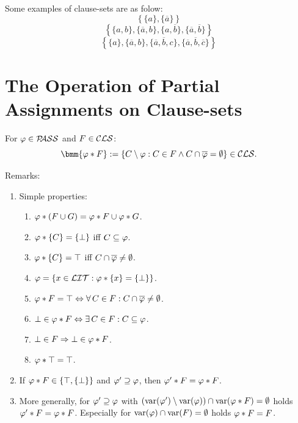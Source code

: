 \documentclass[12pt]{book}
\begin{document}
\begin{examp}\label{exp:cls}
Some examples of clause-sets are as folow:
\begin{displaymath}
     \left\{\{a\}, \{\overline{a}\}\right\}
  \end{displaymath} 
  \begin{displaymath}
     \left\{\{a,b\}, \{\overline{a},b\}, \{a, \overline{b}\}, \{\overline{a},\overline{b}\}\right\}
  \end{displaymath}
  \begin{displaymath}
     \left\{\{a\}, \{\overline{a},b\}, \{\overline{a}, \overline{b}, c\}, \{\overline{a}, \overline{b}, \overline{c}\}\right\}
  \end{displaymath}
\end{examp}


\section{The Operation of Partial Assignments on Clause-sets}
\label{sec:oppasscls}

\begin{defi}\label{def:oppassCls}
  For $\varphi \in \mathcal{P\hspace{-0.32em}ASS}$ and $F \in \mathcal{CLS}$:
  \begin{displaymath}
    \bmm{\vp * F} := \set{C \sm \vp : C \in F \wedge C \cap \ol{\vp} = \es} \in \Cls.
  \end{displaymath}
\end{defi}
Remarks:
\begin{enumerate}
\item Simple properties:
  \begin{enumerate}
  \item $\varphi * (F \cup G) = \varphi * F \cup \varphi * G$.
  \item $\varphi * \{ C \} = \{ \bot \}$ iff $C \subseteq \varphi$.
  \item $\varphi * \{ C \} = \top$ iff $C \cap \overline{\varphi} \ne \emptyset$.
  \item $\varphi = \{ x \in \mathcal{LIT} : \varphi * \{ x \} = \{ \bot \} \}$.
  \item $\varphi * F = \top \Leftrightarrow \forall\, C \in F : C \cap \overline{\varphi} \ne \emptyset$.
  \item $\bot \in \varphi * F \Leftrightarrow \exists\, C \in F : C \subseteq \varphi$.
  \item $\bot \in F \Rightarrow \bot \in \varphi * F$.
  \item $\varphi * \top = \top$.
  \end{enumerate}
\item If $\varphi * F \in \{ \top, \{ \bot \} \}$ and $\varphi' \supseteq \varphi$, then $\varphi' * F = \varphi * F$.
\item More generally, for $\varphi' \supseteq \varphi$ with $(\operatorname{var}(\varphi') \setminus \operatorname{var}(\varphi)) \cap \operatorname{var}(\varphi * F) = \emptyset$ holds $\varphi' * F = \varphi * F$. Especially for $\operatorname{var}(\varphi) \cap \operatorname{var}(F) = \emptyset$ holds $\varphi * F = F$.
\end{enumerate}
\end{document}
